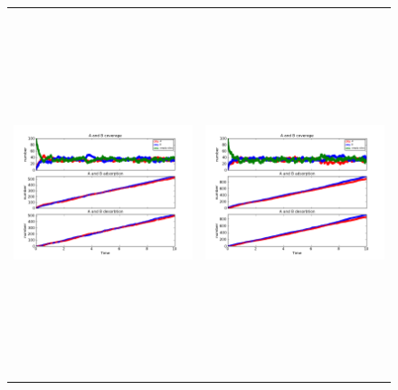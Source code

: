 \documentclass[11pt]{article}
\begin{document}
\setlength{\unitlength}{1in}
\begin{figure}[h!]
\begin{tabular}{cc}
\includegraphics[width=3.5in, height=4.2in]{./coadsorb/AtoBcoadsorb10x10_101_allsameksmall__A5_EA1E3_1.png} &
\includegraphics[width=3.5in, height=4.2in]{./coadsorb/AtoBcoadsorb10x10_201_allsameksmall__A5_EA1E3_1.png} \\

\end{tabular}
\end{figure}
\end{document}
